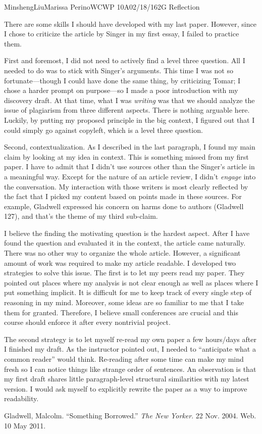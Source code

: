 \documentclass[12pt,letterpaper]{article}
\begin{document}
\begin{mla}{Minsheng}{Liu}{Marissa Perino}{WCWP 10A}{02/18/16}{2G Reflection}

There are some skills I should have developed with my last paper.
However, since I chose to criticize the article by Singer in my first
essay, I failed to practice them.

First and foremost, I did not need to actively find a level three
question. All I needed to do was to stick with Singer's arguments. This
time I was not so fortunate---though I could have done the same thing,
by criticizing Tomar; I chose a harder prompt on purpose---so I made a
poor introduction with my discovery draft. At that time, what I was
\emph{writing} was that we should analyze the issue of plagiarism from
three different aspects. There is nothing arguable here. Luckily, by
putting my proposed principle in the big context, I figured out that I
could simply go against copyleft, which is a level three question.

Second, contextualization. As I described in the last paragraph, I found
my main claim by looking at my idea in context. This is something missed
from my first paper. I have to admit that I didn't use sources other
than the Singer's article in a meaningful way. Except for the nature of
an article review, I didn't \emph{engage} into the conversation. My
interaction with those writers is most clearly reflected by the fact
that I picked my content based on points made in these sources. For
example, Gladwell expressed his concern on harms done to authors
(Gladwell 127), and that's the theme of my third sub-claim.

I believe the finding the motivating question is the hardest aspect.
After I have found the question and evaluated it in the context, the
article came naturally. There was no other way to organize the whole
article. However, a significant amount of work was required to make my
article readable. I developed two strategies to solve this issue. The
first is to let my peers read my paper. They pointed out places where my
analysis is not clear enough as well as places where I put something
implicit. It is difficult for me to keep track of every single step of
reasoning in my mind. Moreover, some ideas are so familiar to me that I
take them for granted. Therefore, I believe small conferences are
crucial and this course should enforce it after every nontrivial
project.

The second strategy is to let myself re-read my own paper a few
hours/days after I finished my draft. As the instructor pointed out, I
needed to ``anticipate what a common reader'' would think. Re-reading
after some time can make my mind fresh so I can notice things like
strange order of sentences. An observation is that my first draft shares
little paragraph-level structural similarities with my latest version. I
would ask myself to explicitly rewrite the paper as a way to improve
readability.


\begin{workscited}
\bibent Gladwell, Malcolm. ``Something Borrowed.'' \textit{The New Yorker}.
22 Nov. 2004. Web. 10 May 2011.
\end{workscited}
\end{mla}
\end{document}
